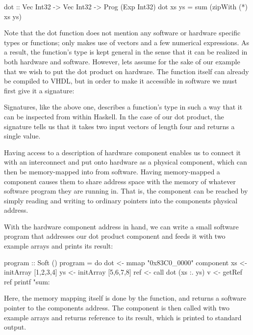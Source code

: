 \documentclass[../main.tex]{subfiles}
\begin{document}
\begin{code}
dot :: Vec Int32 -> Vec Int32 -> Prog (Exp Int32)
dot xs ys = sum (zipWith (*) xs ys)
\end{code}

Note that the dot function does not mention any software or hardware specific types or functions;  only makes use of vectors and a few numerical expressions. As a result, the function's type is kept general in the sense that it can be realized in both hardware and software. However, lets assume for the sake of our example that we wish to put the dot product on hardware. The function itself can already be compiled to VHDL, but in order to make it accessible in software we must first give it a signature:


\noindent Signatures, like the above one, describes a function's type in such a way that it can be inspected from within Haskell. In the case of our dot product, the signature tells us that it takes two input vectors of length four and returns a single value.

Having access to a description of hardware component enables us to connect it with an interconnect and put onto hardware as a physical component, which can then be memory-mapped into from software. Having memory-mapped a component causes them to share address space with the memory of whatever software program they are running in. That is, the component can be reached by simply reading and writing to ordinary pointers into the components physical address.

With the hardware component address in hand, we can write a small software program that addresses our dot product component and feeds it with two example arrays and prints its result:

\begin{code}
program :: Soft ()
program = do
  dot <- mmap "0x83C0_0000" component
  xs  <- initArray [1,2,3,4]
  ys  <- initArray [5,6,7,8]
  ref <- call dot (xs :. ys)
  v   <- getRef ref
  printf "sum: %
\end{code}

\noindent Here, the memory mapping itself is done by the  function, and returns a software pointer to the components address. The component is then called with two example arrays and returns reference to its result, which is printed to standard output.
\end{document}
